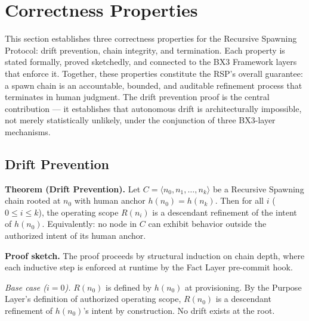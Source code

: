\section{Correctness Properties}
\label{sec:rs-correctness}

This section establishes three correctness properties for the Recursive Spawning Protocol: drift prevention, chain integrity, and termination. Each property is stated formally, proved sketchedly, and connected to the BX3 Framework layers that enforce it. Together, these properties constitute the RSP's overall guarantee: a spawn chain is an accountable, bounded, and auditable refinement process that terminates in human judgment. The drift prevention proof is the central contribution — it establishes that autonomous drift is architecturally impossible, not merely statistically unlikely, under the conjunction of three BX3-layer mechanisms.

\subsection{Drift Prevention}
\label{sec:rs-drift-prevention}

\medskip
\noindent\textbf{Theorem (Drift Prevention).} Let $C = \langle n_0, n_1, \ldots, n_k \rangle$ be a Recursive Spawning chain rooted at $n_0$ with human anchor $h(n_0) = h(n_k)$. Then for all $i$ ($0 \leq i \leq k$), the operating scope $R(n_i)$ is a descendant refinement of the intent of $h(n_0)$. Equivalently: no node in $C$ can exhibit behavior outside the authorized intent of its human anchor.

\medskip
\noindent\textbf{Proof sketch.} The proof proceeds by structural induction on chain depth, where each inductive step is enforced at runtime by the Fact Layer pre-commit hook.

\medskip
\textit{Base case ($i=0$).} $R(n_0)$ is defined by $h(n_0)$ at provisioning. By the Purpose Layer's definition of authorized operating scope, $R(n_0)$ is a descendant refinement of $h(n_0)$'s intent by construction. No drift exists at the root.

